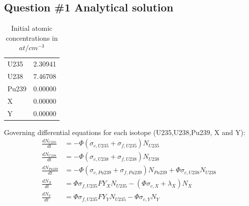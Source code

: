\documentclass[11pt,a4paper]{article}
\begin{document}
\subsection{Question \#1 Analytical solution}


\begin{table}[H]
	\centering
	\begin{tabular}{|l|c|}
		\hline
		U235& 2.30941 \\
		U238& 7.46708 \\
		Pu239& 0.00000 \\
		X& 0.00000 \\
		Y& 0.00000 \\
		\hline
	\end{tabular}
	\caption{Initial atomic concentrations in $at/cm^{-3}$}
\end{table}

Governing differential equations for each isotope (U235,U238,Pu239, X and Y):
\begin{equation}
	\begin{split}
	\frac{dN_{U235}}{dt} &= -\Phi(\sigma_{c,U235} + \sigma_{f,U235})N_{U235} \\
	\frac{dN_{U238}}{dt} &= -\Phi(\sigma_{c,U238} + \sigma_{f,U238})N_{U238} \\
	\frac{dN_{Pu239}}{dt} &= -\Phi(\sigma_{c,Pu239} + \sigma_{f,Pu239})N_{Pu239} + \Phi \sigma_{c,U238} N_{U238} \\
	\frac{dN_{X}}{dt} &= \Phi \sigma_{f,U235} FY_X N_{U235} - (\Phi \sigma_{c,X} + \lambda_X) N_X \\
	\frac{dN_{Y}}{dt} &=  \Phi \sigma_{f,U235} FY_Y N_{U235} -\Phi \sigma_{c,Y} N_Y\\
	\end{split}	 
\end{equation}
\end{document}
